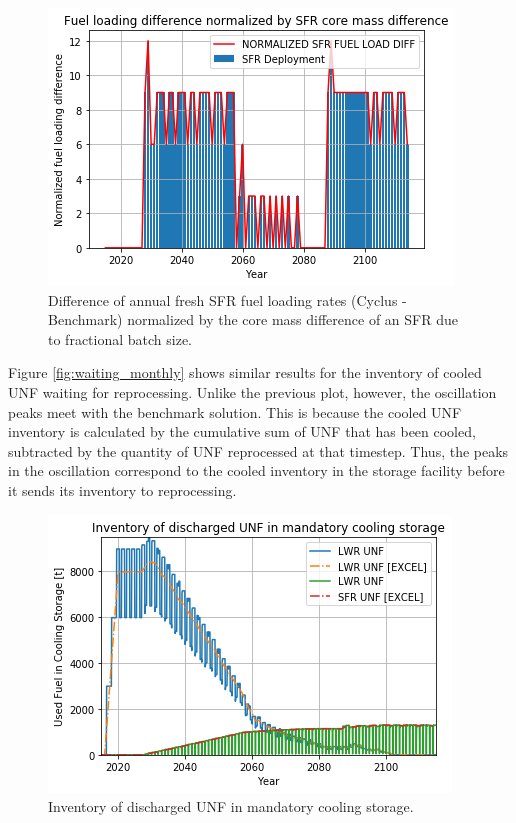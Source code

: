 \begin{figure}[htbp!]
    \begin{center}
        \includegraphics[scale=0.5]{./images/results_18/fuel_load_diff_norm.png}
    \end{center}
        \caption{Difference of annual fresh \gls{SFR} fuel loading rates (Cyclus - Benchmark) normalized by the core mass difference of an \gls{SFR} due to fractional batch size.}
    \label{fig:fuel_load_diff_norm}
\end{figure}


Figure \ref{fig:waiting_monthly} shows similar results for the inventory of cooled
\gls{UNF} waiting for reprocessing.
Unlike the previous plot, however, the oscillation peaks meet with the benchmark
solution.  This is because the cooled \gls{UNF} inventory is calculated by the cumulative sum
of \gls{UNF} that has been cooled, subtracted by the quantity of \gls{UNF} reprocessed at that timestep.
Thus, the peaks in the oscillation correspond to the cooled inventory in the storage
facility before it sends its inventory to reprocessing.

\begin{figure}[htbp!]
    \begin{center}
        \includegraphics[scale=0.5]{./images/results_18/fuel_discharge_monthly.png}
    \end{center}
        \caption{Inventory of discharged \gls{UNF} in mandatory cooling storage.}
    \label{fig:fuel_discharge_monthly}
\end{figure}


